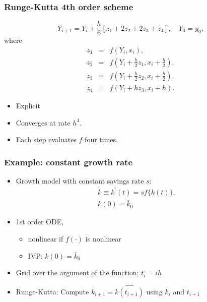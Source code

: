 \documentclass[bigger,handout]{beamer}
\begin{document}
\begin{frame}%
  
\frametitle{Runge-Kutta 4th order scheme}

\begin{equation*}
Y_{i+1}=Y_{i}+\frac{h}{6}\left[ z_{1}+2z_{2}+2z_{3}+z_{4}\right] ,\quad
Y_{0}=y_{0},
\end{equation*}%
where 
\begin{eqnarray*}
z_{1} &=&f(Y_{i},x_{i}), \\
z_{2} &=&f(Y_{i}+\frac{h}{2}z_{1},x_{i}+\frac{h}{2}), \\
z_{3} &=&f(Y_{i}+\frac{h}{2}z_{2},x_{i}+\frac{h}{2}), \\
z_{4} &=&f(Y_{i}+hz_{3},x_{i}+h).
\end{eqnarray*}

\begin{itemize}
\item Explicit

\item Converges at rate $h^{4}$.

\item Each step evaluates $f$ four times.
\end{itemize}

  
 
\end{frame}%
  
 
 
\begin{frame}%
  
\frametitle{Example: constant growth rate}

\begin{itemize}
\item Growth model with constant savings rate $s$:%
\begin{gather*}
\dot{k}\equiv k^{\prime }(t)=sf\{k(t)\}, \\
k\left( 0\right) =\bar{k}_{0}
\end{gather*}

\item 1st order ODE,

\begin{itemize}
\item nonlinear if $f\left( \cdot \right) $ is nonlinear

\item IVP: $k\left( 0\right) =\bar{k}_{0}$
\end{itemize}

\item Grid over the argument of the function: $t_{i}=ih$

\item Runge-Kutta: Compute $k_{i+1}=\widehat{k\left( t_{i+1}\right) }$ using $k_{i}$
and $t_{i+1}$
\end{itemize}

  
 
\end{frame}%
  
\end{document}
